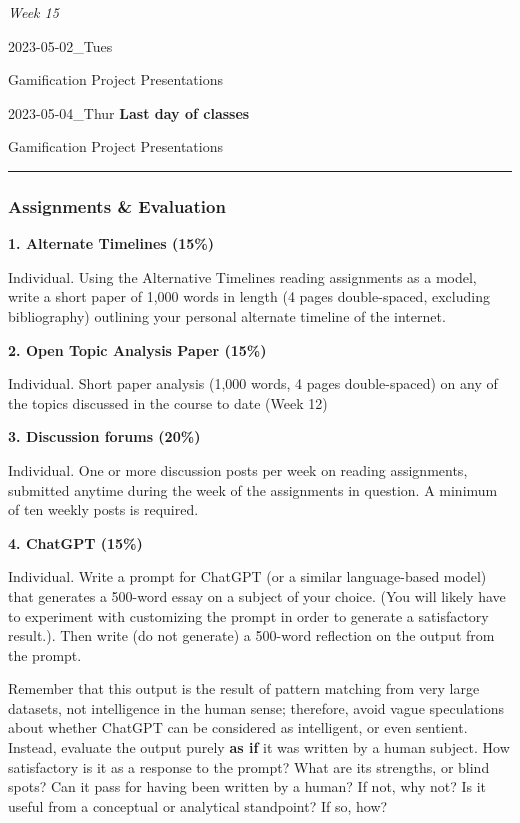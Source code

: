 \documentclass[
  letterpaper,
  DIV=11,
  numbers=noendperiod]{scrartcl}
\begin{document}
\emph{Week 15}

2023-05-02\_Tues

Gamification Project Presentations

2023-05-04\_Thur \textbf{Last day of classes}

Gamification Project Presentations

\begin{center}\rule{0.5\linewidth}{0.5pt}\end{center}

\hypertarget{assignments-evaluation}{%
\subsubsection{Assignments \& Evaluation}\label{assignments-evaluation}}

\textbf{1. Alternate Timelines (15\%)}

Individual. Using the Alternative Timelines reading assignments as a
model, write a short paper of 1,000 words in length (4 pages
double-spaced, excluding bibliography) outlining your personal alternate
timeline of the internet.

\textbf{2. Open Topic Analysis Paper (15\%)}

Individual. Short paper analysis (1,000 words, 4 pages double-spaced) on
any of the topics discussed in the course to date (Week 12)

\textbf{3. Discussion forums (20\%)}

Individual. One or more discussion posts per week on reading
assignments, submitted anytime during the week of the assignments in
question. A minimum of ten weekly posts is required.

\textbf{4. ChatGPT (15\%)}

Individual. Write a prompt for ChatGPT (or a similar language-based
model) that generates a 500-word essay on a subject of your choice. (You
will likely have to experiment with customizing the prompt in order to
generate a satisfactory result.). Then write (do not generate) a
500-word reflection on the output from the prompt.

Remember that this output is the result of pattern matching from very
large datasets, not intelligence in the human sense; therefore, avoid
vague speculations about whether ChatGPT can be considered as
intelligent, or even sentient. Instead, evaluate the output purely
\textbf{as if} it was written by a human subject. How satisfactory is it
as a response to the prompt? What are its strengths, or blind spots? Can
it pass for having been written by a human? If not, why not? Is it
useful from a conceptual or analytical standpoint? If so, how?
\end{document}

